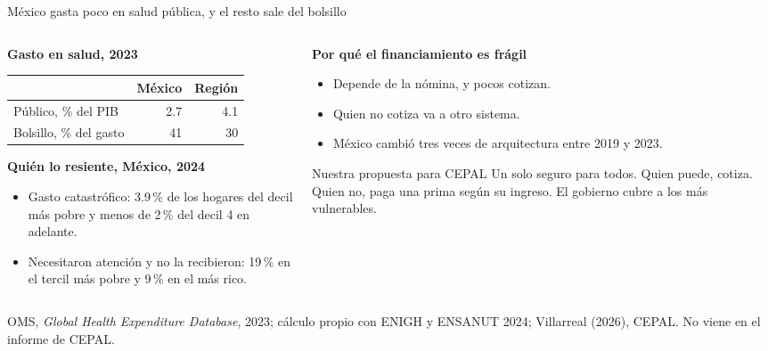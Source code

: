 \documentclass[aspectratio=169,11pt]{beamer}
\newcommand{\fuente}[1]{\par\vfill{\small\color{cGris}#1\par}}
\begin{document}
\begin{frame}{México gasta poco en salud pública, y el resto sale del bolsillo}
  \begin{columns}[T]
    \begin{column}{0.49\textwidth}
      \textbf{Gasto en salud, 2023}\par\smallskip
      \begin{tabular}{@{}lrr@{}}
        \toprule
        & México & Región \\
        \midrule
        Público, \% del PIB & 2.7 & 4.1 \\
        Bolsillo, \% del gasto & 41 & 30 \\
        \bottomrule
      \end{tabular}
      \par\medskip
      \textbf{Quién lo resiente, México, 2024}
      \begin{itemize}
        \item Gasto catastrófico: 3.9\,\% de los hogares del decil más pobre y menos de 2\,\% del decil 4 en adelante.
        \item Necesitaron atención y no la recibieron: 19\,\% en el tercil más pobre y 9\,\% en el más rico.
      \end{itemize}
    \end{column}
    \begin{column}{0.48\textwidth}
      \pause
      \textbf{Por qué el financiamiento es frágil}
      \begin{itemize}
        \item Depende de la nómina, y pocos cotizan.
        \item Quien no cotiza va a otro sistema.
        \item México cambió tres veces de arquitectura entre 2019 y 2023.
      \end{itemize}
      \pause
      \begin{block}{Nuestra propuesta para CEPAL}
        Un solo seguro para todos. Quien puede, cotiza. Quien no, paga una prima según su ingreso. El gobierno cubre a los más vulnerables.
      \end{block}
    \end{column}
  \end{columns}
  \fuente{OMS, \emph{Global Health Expenditure Database}, 2023; cálculo propio con ENIGH y ENSANUT 2024; Villarreal (2026), CEPAL. No viene en el informe de CEPAL.}
\end{frame}
\end{document}
